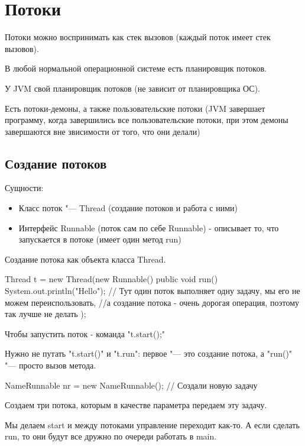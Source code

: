 \chapter{Потоки}

﻿Потоки можно воспринимать как стек вызовов (каждый поток имеет стек вызовов).

В любой нормальной операционной системе есть планировщик потоков.

У JVM свой планировщик потоков (не зависит от планировщика ОС).

Есть потоки-демоны, а также пользовательские потоки 
(JVM завершает программу, когда завершились все пользовательские потоки, при этом демоны завершаются вне звисимости от того, что они делали)


\section{Создание потоков}
Сущности:
\begin{itemize}
	\item
		Класс поток "--- Thread (создание потоков и работа с ними)
	\item
		Интерфейс Runnable (поток сам по себе Runnable) - описывает то, что запускается в потоке (имеет один метод run)
\end{itemize}


Создание потока как объекта класса Thread. 
\begin{javacode}
Thread t = new Thread(new Runnable() {
	public void run() {
    		System.out.println("Hello"); 
		// Тут один поток выполняет одну задачу, мы его не можем переиспользовать, 
		//а создание потока - очень дорогая операция, поэтому так лучше не делать
	}
});
\end{javacode}

Чтобы запустить поток - команда \java"t.start();"

Нужно не путать \java"t.start()" и \java"t.run": первое "--- это создание потока, а \java"run()" "--- просто вызов метода.

\begin{javacode}
NameRunnable nr = new NameRunnable(); // Создали новую задачу
\end{javacode}
Создаем три потока, которым в качестве параметра передаем эту задачу.

Мы делаем start и между потоками управление переходит как-то.
А если сделать run, то они будут все дружно по очереди работать в main.


